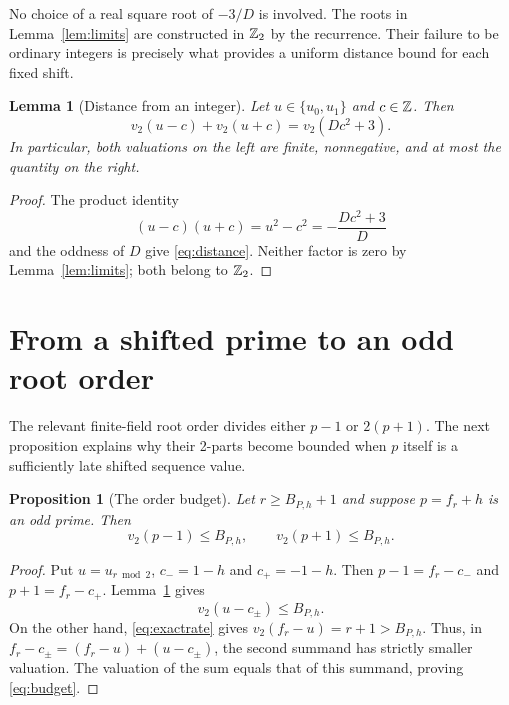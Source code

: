 \documentclass[11pt,a4paper]{article}
\newtheorem{lemma}[theorem]{Lemma}
\newtheorem{proposition}[theorem]{Proposition}
\theoremstyle{definition}\newtheorem{definition}[theorem]{Definition}
\theoremstyle{remark}\newtheorem{remark}[theorem]{Remark}
\begin{document}
No choice of a real square root of $-3/D$ is involved. The roots in
Lemma~\ref{lem:limits} are constructed in $\mathbb Z_2$ by the recurrence.
Their failure to be ordinary integers is precisely what provides a
uniform distance bound for each fixed shift.

\begin{lemma}[Distance from an integer]\label{lem:distance}
Let $u\in\{u_0,u_1\}$ and $c\in\mathbb Z$. Then
\begin{equation}\label{eq:distance}
 v_2(u-c)+v_2(u+c)=v_2(Dc^2+3).
\end{equation}
In particular, both valuations on the left are finite, nonnegative,
and at most the quantity on the right.
\end{lemma}
\begin{proof}
The product identity
\[
 (u-c)(u+c)=u^2-c^2=-\frac{Dc^2+3}{D}
\]
and the oddness of $D$ give \eqref{eq:distance}. Neither factor is zero
by Lemma~\ref{lem:limits}; both belong to $\mathbb Z_2$.
\end{proof}

\section{From a shifted prime to an odd root order}
The relevant finite-field root order divides either $p-1$ or
$2(p+1)$. The next proposition explains why their 2-parts become
bounded when $p$ itself is a sufficiently late shifted sequence value.

\begin{proposition}[The order budget]\label{prop:budget}
Let $r\ge B_{P,h}+1$ and suppose $p=f_r+h$ is an odd prime. Then
\begin{equation}\label{eq:budget}
 v_2(p-1)\le B_{P,h},\qquad v_2(p+1)\le B_{P,h}.
\end{equation}
\end{proposition}
\begin{proof}
Put $u=u_{r\bmod2}$, $c_-=1-h$ and $c_+=-1-h$. Then
$p-1=f_r-c_-$ and $p+1=f_r-c_+$. Lemma~\ref{lem:distance} gives
\[
 v_2(u-c_\pm)\le B_{P,h}.
\]
On the other hand, \eqref{eq:exactrate} gives
$v_2(f_r-u)=r+1>B_{P,h}$. Thus, in
$f_r-c_\pm=(f_r-u)+(u-c_\pm)$, the second summand has strictly
smaller valuation. The valuation of the sum equals that of this
summand, proving \eqref{eq:budget}.
\end{proof}
\end{document}
